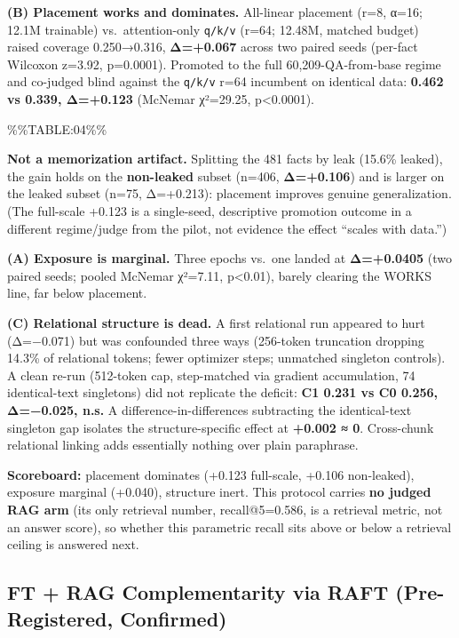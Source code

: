 \textbf{(B) Placement works and dominates.} All-linear placement (r=8, α=16; 12.1M trainable) vs.~attention-only \texttt{q/k/v} (r=64; 12.48M, matched budget) raised coverage 0.250→0.316, \textbf{Δ=+0.067} across two paired seeds (per-fact Wilcoxon z=3.92, p=0.0001). Promoted to the full 60,209-QA-from-base regime and co-judged blind against the \texttt{q/k/v} r=64 incumbent on identical data: \textbf{0.462 vs 0.339, Δ=+0.123} (McNemar χ²=29.25, p\textless0.0001).

\%\%TABLE:04\%\%

\textbf{Not a memorization artifact.} Splitting the 481 facts by leak (15.6\% leaked), the gain holds on the \textbf{non-leaked} subset (n=406, \textbf{Δ=+0.106}) and is larger on the leaked subset (n=75, Δ=+0.213): placement improves genuine generalization. (The full-scale +0.123 is a single-seed, descriptive promotion outcome in a different regime/judge from the pilot, not evidence the effect ``scales with data.'')

\textbf{(A) Exposure is marginal.} Three epochs vs.~one landed at \textbf{Δ=+0.0405} (two paired seeds; pooled McNemar χ²=7.11, p\textless0.01), barely clearing the WORKS line, far below placement.

\textbf{(C) Relational structure is dead.} A first relational run appeared to hurt (Δ=−0.071) but was confounded three ways (256-token truncation dropping 14.3\% of relational tokens; fewer optimizer steps; unmatched singleton controls). A clean re-run (512-token cap, step-matched via gradient accumulation, 74 identical-text singletons) did not replicate the deficit: \textbf{C1 0.231 vs C0 0.256, Δ=−0.025, n.s.} A difference-in-differences subtracting the identical-text singleton gap isolates the structure-specific effect at \textbf{+0.002 ≈ 0}. Cross-chunk relational linking adds essentially nothing over plain paraphrase.

\textbf{Scoreboard:} placement dominates (+0.123 full-scale, +0.106 non-leaked), exposure marginal (+0.040), structure inert. This protocol carries \textbf{no judged RAG arm} (its only retrieval number, recall@5=0.586, is a retrieval metric, not an answer score), so whether this parametric recall sits above or below a retrieval ceiling is answered next.

\hypertarget{ft-rag-complementarity-via-raft-pre-registered-confirmed}{%
\subsection{FT + RAG Complementarity via RAFT (Pre-Registered, Confirmed)}\label{ft-rag-complementarity-via-raft-pre-registered-confirmed}}

